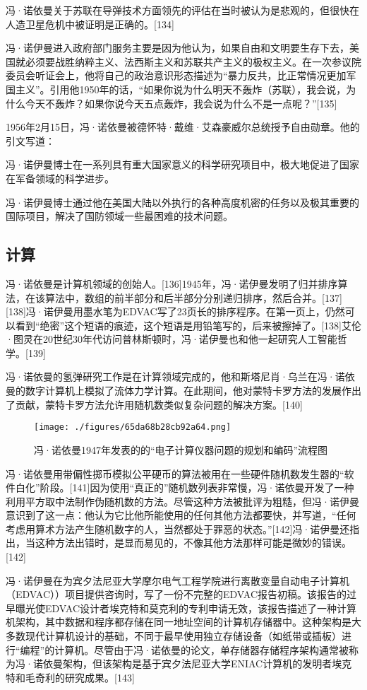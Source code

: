 冯·诺依曼关于苏联在导弹技术方面领先的评估在当时被认为是悲观的，但很快在人造卫星危机中被证明是正确的。[134]

冯·诺伊曼进入政府部门服务主要是因为他认为，如果自由和文明要生存下去，美国就必须要战胜纳粹主义、法西斯主义和苏联共产主义的极权主义。在一次参议院委员会听证会上，他将自己的政治意识形态描述为“暴力反共，比正常情况更加军国主义”。引用他1950年的话，“如果你说为什么明天不轰炸（苏联），我会说，为什么今天不轰炸？如果你说今天五点轰炸，我会说为什么不是一点呢？”[135]

1956年2月15日，冯·诺依曼被德怀特·戴维·艾森豪威尔总统授予自由勋章。他的引文写道：

冯·诺伊曼博士在一系列具有重大国家意义的科学研究项目中，极大地促进了国家在军备领域的科学进步。

冯·诺伊曼博士通过他在美国大陆以外执行的各种高度机密的任务以及极其重要的国际项目，解决了国防领域一些最困难的技术问题。

\subsection{计算}
冯·诺依曼是计算机领域的创始人。[136]1945年，冯·诺伊曼发明了归并排序算法，在该算法中，数组的前半部分和后半部分分别递归排序，然后合并。[137][138]冯·诺伊曼用墨水笔为EDVAC写了23页长的排序程序。在第一页上，仍然可以看到“绝密”这个短语的痕迹，这个短语是用铅笔写的，后来被擦掉了。[138]艾伦·图灵在20世纪30年代访问普林斯顿时，冯·诺伊曼也和他一起研究人工智能哲学。[139]

冯·诺依曼的氢弹研究工作是在计算领域完成的，他和斯塔尼肖·乌兰在冯·诺依曼的数字计算机上模拟了流体力学计算。在此期间，他对蒙特卡罗方法的发展作出了贡献，蒙特卡罗方法允许用随机数类似复杂问题的解决方案。[140]
\begin{figure}[ht]
\centering
\texttt{[image: ./figures/65da68b28cb92a64.png]}
\caption{冯·诺依曼1947年发表的的“电子计算仪器问题的规划和编码”流程图} \label{fig_von_8}
\end{figure}
冯·诺依曼用带偏性掷币模拟公平硬币的算法被用在一些硬件随机数发生器的“软件白化”阶段。[141]因为使用“真正的”随机数列表非常慢，冯·诺依曼开发了一种利用平方取中法制作伪随机数的方法。尽管这种方法被批评为粗糙，但冯·诺伊曼意识到了这一点：他认为它比他所能使用的任何其他方法都要快，并写道，“任何考虑用算术方法产生随机数字的人，当然都处于罪恶的状态。”[142]冯·诺伊曼还指出，当这种方法出错时，是显而易见的，不像其他方法那样可能是微妙的错误。[142]

冯·诺伊曼在为宾夕法尼亚大学摩尔电气工程学院进行离散变量自动电子计算机（EDVAC））项目提供咨询时，写了一份不完整的EDVAC报告初稿。该报告的过早曝光使EDVAC设计者埃克特和莫克利的专利申请无效，该报告描述了一种计算机架构，其中数据和程序都存储在同一地址空间的计算机存储器中。这种架构是大多数现代计算机设计的基础，不同于最早使用独立存储设备（如纸带或插板）进行“编程”的计算机。尽管由于冯·诺依曼的论文，单存储器存储程序架构通常被称为冯·诺依曼架构，但该架构是基于宾夕法尼亚大学ENIAC计算机的发明者埃克特和毛奇利的研究成果。[143]

